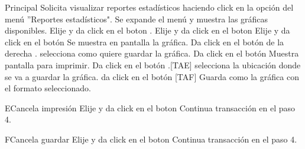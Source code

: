 \begin{UCtrayectoria}{Principal}
  \UCpaso[\UCactor] Solicita visualizar reportes estadísticos haciendo click en la opción del menú ''Reportes estadísticos".
  \UCpaso Se expande el menú y muestra las gráficas disponibles. 
  \UCpaso [\UCactor] Elije y da click en el boton . 
    \UCpaso [\UCactor] Elije y da click en el boton 
    \UCpaso [\UCactor] Elije y da click en el botón 
  \UCpaso Se muestra en pantalla la gráfica.
  \UCpaso [\UCactor] Da click en el botón de la derecha . 
  \UCpaso [\UCactor] selecciona como quiere guardar la gráfica. 
   \UCpaso [\UCactor] Da click en el botón 
  \UCpaso Muestra pantalla para imprimir.
  \UCpaso [\UCactor] Da click en el botón .[TAE]
  \UCpaso [\UCactor] selecciona la ubicación donde se va a guardar la gráfica. 
  \UCpaso [\UCactor] da click en el botón  [TAF]
  \UCpaso Guarda como la gráfica con  el formato seleccionado.
\end{UCtrayectoria}


\begin{UCtrayectoriaA}{E}{Cancela impresión} 
  \UCpaso [\UCactor] Elije y da click en el boton 
  \UCpaso Continua transacción en el paso 4.
\end{UCtrayectoriaA}

\begin{UCtrayectoriaA}{F}{Cancela guardar} 
  \UCpaso [\UCactor] Elije y da click en el boton 
  \UCpaso Continua transacción en el paso 4.
\end{UCtrayectoriaA}


